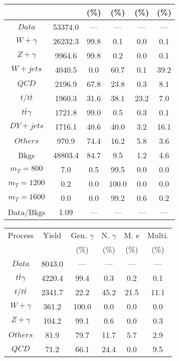 \begin{figure}
\begin{minipage}[c]{0.32\textwidth}
{\begin{tabular}{cccccc}
 &  & (\%) & (\%) & (\%) & (\%)  \\
\hline
                                                                      $ Data $ &  53374.0 &  --- &  --- &  --- &  ---\\
$ W+\gamma $ &  26232.3 &  99.8 &  0.1 &  0.0 &  0.1\\
$ Z+\gamma $ &  9964.6 &  99.8 &  0.2 &  0.0 &  0.1\\
$ W+jets $ &  4040.5 &  0.0 &  60.7 &  0.1 &  39.2\\
$ QCD $ &  2196.9 &  67.8 &  23.8 &  0.3 &  8.1\\
$ t/t\bar{t} $ &  1960.3 &  31.6 &  38.1 &  23.2 &  7.0\\
$ t\bar{t}\gamma $ &  1721.8 &  99.0 &  0.5 &  0.3 &  0.1\\
$ DY+jets $ &  1716.1 &  40.6 &  40.0 &  3.2 &  16.1\\
$ Others $ &  970.9 &  74.4 &  16.2 &  5.8 &  3.6\\
Bkgs &  48803.4 &  84.7 &  9.5 &  1.2 &  4.6\\
$ m_{T} = 800 $ &  7.0 &  0.5 &  99.5 &  0.0 &  0.0\\
$ m_{T} = 1200 $ &  0.2 &  0.0 &  100.0 &  0.0 &  0.0\\
$ m_{T} = 1600 $ &  0.0 &  0.0 &  99.2 &  0.6 &  0.2\\
Data/Bkgs &  1.09 &  --- &  --- &  --- &  ---\\
\hline
\end{tabular}
}
\end{minipage}
\begin{minipage}[c]{0.32\textwidth}
\centering
\tiny{
\begin{tabular}{cccccc}
\hline
Process & Yield & Gen. $\gamma$ & N. $\gamma$ & M. e & Multi. \\
 &  & (\%) & (\%) & (\%) & (\%)  \\
\hline
                                                                      $ Data $ &  8043.0 &  --- &  --- &  --- &  ---\\
$ t\bar{t}\gamma $ &  4220.4 &  99.4 &  0.3 &  0.2 &  0.1\\
$ t/t\bar{t} $ &  2341.7 &  22.2 &  45.2 &  21.5 &  11.1\\
$ W+\gamma $ &  361.2 &  100.0 &  0.0 &  0.0 &  0.0\\
$ Z+\gamma $ &  104.2 &  99.1 &  0.6 &  0.0 &  0.3\\
$ Others $ &  81.9 &  79.7 &  11.7 &  5.7 &  2.9\\
$ QCD $ &  71.2 &  66.1 &  24.4 &  0.0 &  9.5\\

\end{tabular}}
\end{minipage}
\end{figure}
